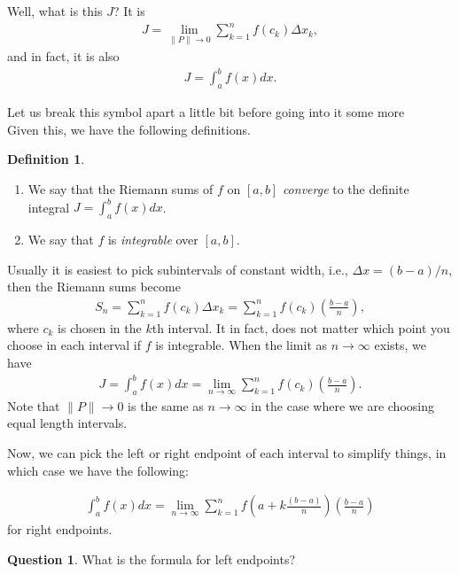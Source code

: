 \documentclass[leqno]{article}
\theoremstyle{definition}
\newtheorem{definition}{Definition}[section]
\newtheorem{question}{Question}[section]
\theoremstyle{remark}
\theoremstyle{theorem}
\begin{document}
Well, what is this $J$? It is
\begin{align*}
J= \lim_{\|P\|\to 0} \sum_{k=1}^n f(c_k)\Delta x_k,
\end{align*}
and in fact, it is also
\begin{align*}
J=\int_a^b f(x) dx.
\end{align*}

Let us break this symbol apart a little bit before going into it some more
\vspace*{4cm}\\

Given this, we have the following definitions.
\begin{definition}~
\begin{enumerate}[1.)]
\item We say that the Riemann sums of $f$ on $[a,b]$ \emph{converge} to the definite integral $J=\int_a^b f(x) dx$.
\item We say that $f$ is \emph{integrable} over $[a,b]$.
\end{enumerate}
\end{definition}

Usually it is easiest to pick subintervals of constant width, i.e., $\Delta x = (b-a)/n$, then the Riemann sums become
\begin{align*}
S_n = \sum_{k=1}^n f(c_k)\Delta x_k = \sum_{k=1}^n f(c_k) \left( \frac{b-a}{n}\right),
\end{align*}
where $c_k$ is chosen in the $k$th interval.  It in fact, does not matter which point you choose in each interval if $f$ is integrable. When the limit as $n\to \infty$ exists, we have
\begin{align*}
J=\int_a^b f(x)dx = \lim_{n\to \infty}\sum_{k=1}^n f(c_k) \left( \frac{b-a}{n} \right).
\end{align*}
Note that $\|P\|\to 0$ is the same as $n\to \infty$ in the case where we are choosing equal length intervals.

Now, we can pick the left or right endpoint of each interval to simplify things, in which case we have the following:

\begin{align*}
\int_a^b f(x)dx = \lim_{n\to \infty} \sum_{k=1}^n f\left( a + k\frac{(b-a)}{n}\right) \left( \frac{b-a}{n}\right)
\end{align*}
for right endpoints. 

\begin{question}
What is the formula for left endpoints?
\end{question}
\end{document}
